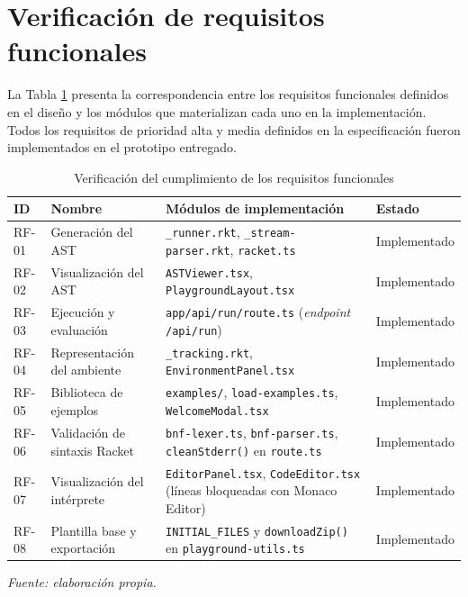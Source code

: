 \section{Verificación de requisitos funcionales}

La Tabla \ref{tab:verificacion_rf} presenta la correspondencia entre los requisitos funcionales definidos en el diseño y los módulos que materializan cada uno en la implementación. Todos los requisitos de prioridad alta y media definidos en la especificación fueron implementados en el prototipo entregado.

\begin{table}[H]
\centering
\caption{Verificación del cumplimiento de los requisitos funcionales}
\label{tab:verificacion_rf}
\footnotesize
\setlength{\tabcolsep}{4pt}
\begin{tabular}{
  >{\centering\arraybackslash}p{1.2cm}
  >{\raggedright\arraybackslash}p{3.8cm}
  >{\raggedright\arraybackslash}p{6.8cm}
  >{\centering\arraybackslash}p{2.1cm}
}
\hline
\textbf{ID} & \textbf{Nombre} & \textbf{Módulos de implementación} & \textbf{Estado} \\
\hline
RF-01 & Generación del AST &
  \texttt{\_runner.rkt}, \texttt{\_stream-parser.rkt}, \texttt{racket.ts} &
  Implementado \\
RF-02 & Visualización del AST &
  \texttt{AST\allowbreak Viewer.tsx}, \texttt{Playground\allowbreak Layout.tsx} &
  Implementado \\
RF-03 & Ejecución y evaluación &
  \texttt{app/\allowbreak api/\allowbreak run/\allowbreak route.ts} (\textit{endpoint} \texttt{/\allowbreak api/\allowbreak run}) &
  Implementado \\
RF-04 & Representación del ambiente &
  \texttt{\_tracking.rkt}, \texttt{Environment\allowbreak Panel.tsx} &
  Implementado \\
RF-05 & Biblioteca de ejemplos &
  \texttt{examples/}, \texttt{load-examples.ts}, \texttt{Welcome\allowbreak Modal.tsx} &
  Implementado \\
RF-06 & Validación de sintaxis Racket &
  \texttt{bnf-lexer.ts}, \texttt{bnf-parser.ts}, \texttt{clean\allowbreak Stderr()} en \texttt{route.ts} &
  Implementado \\
RF-07 & Visualización del intérprete &
  \texttt{Editor\allowbreak Panel.tsx}, \texttt{Code\allowbreak Editor.tsx} (líneas bloqueadas con Monaco Editor) &
  Implementado \\
RF-08 & Plantilla base y exportación &
  \texttt{INITIAL\allowbreak\_FILES} y \texttt{download\allowbreak Zip()} en \texttt{playground-utils.ts} &
  Implementado \\
\hline
\end{tabular}
\vskip 4pt
\footnotesize\textit{Fuente: elaboración propia.}
\end{table}

\FloatBarrier
